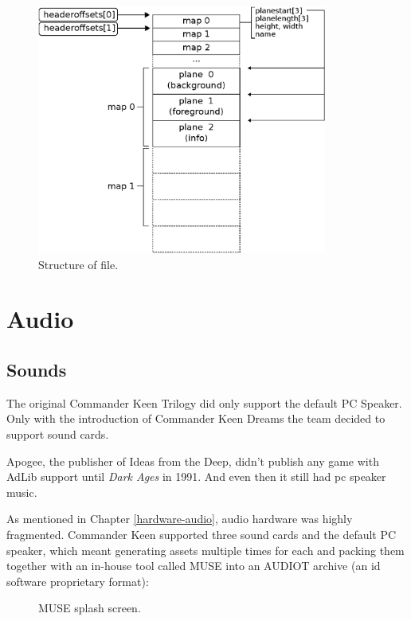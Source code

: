 \documentclass[book.tex]{subfiles}
\begin{document}
\par
\begin{minipage}{\textwidth}
 \par
 \end{minipage}
 
\par
\begin{figure}[H]
\centering
 \includegraphics[width=0.85\textwidth]{imgs/drawings/kdreams_map.eps}
 \caption{Structure of  file.}
 \label{fig:map-file}
\end{figure}

\section{Audio}
\subsection{Sounds}
The original Commander Keen Trilogy did only support the default PC Speaker. Only with the introduction of Commander Keen Dreams the team decided to support sound cards.\\

\par
{} Apogee, the publisher of Ideas from the Deep, didn't publish any game with AdLib support until \textit{Dark Ages} in 1991. And even then it still had pc speaker music.\\
\par




As mentioned in Chapter \ref{hardware-audio}, audio hardware was highly fragmented. Commander Keen supported three sound cards and the default PC speaker, which meant generating assets multiple times for each and packing them together with an in-house tool called MUSE into an AUDIOT archive (an id software proprietary format):\\
\begin{figure}[H]
\centering

  \caption{MUSE splash screen.}
 \end{figure}
 \par
 
\end{document}
